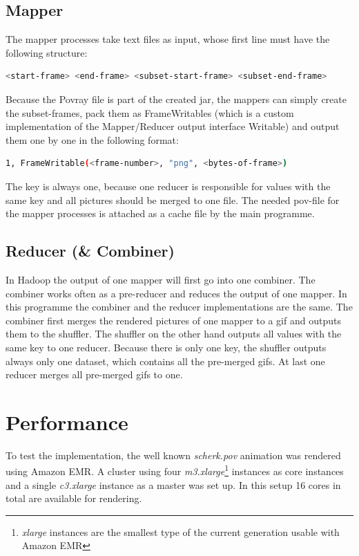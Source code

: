 \documentclass{article}
\begin{document}
\subsection{Mapper}

The mapper processes take text files as input, whose first line must have the following structure:

\begin{lstlisting}[language=bash, deletekeywords={cd}]
  <start-frame> <end-frame> <subset-start-frame> <subset-end-frame>
\end{lstlisting}

Because the Povray file is part of the created jar, the mappers can simply create the subset-frames, pack them as FrameWritables (which is a custom implementation of the Mapper/Reducer output interface Writable) and output them one by one in the following format:

\begin{lstlisting}[language=bash, deletekeywords={cd}]
  1, FrameWritable(<frame-number>, "png", <bytes-of-frame>)
\end{lstlisting}

The key is always one, because one reducer is responsible for values with the same key and all pictures should be merged to one file.
The needed pov-file for the mapper processes is attached as a cache file by the main programme.

\subsection{Reducer (\& Combiner)}
In Hadoop the output of one mapper will first go into one combiner. The combiner works often as a pre-reducer and reduces the output of one mapper. In this programme the combiner and the reducer implementations are the same. The combiner first merges the rendered pictures of one mapper to a gif and outputs them to the shuffler. The shuffler on the other hand outputs all values with the same key to one reducer. Because there is only one key, the shuffler outputs always only one dataset, which contains all the pre-merged gifs. At last one reducer merges all pre-merged gifs to one.

\section{Performance}

To test the implementation, the well known \emph{scherk.pov} animation was rendered using Amazon EMR. A cluster using four \emph{m3.xlarge}\footnote{\emph{xlarge} instances are the smallest type of the current generation usable with Amazon EMR} instances as core instances and a single \emph{c3.xlarge} instance as a master was set up. In this setup 16 cores in total are available for rendering.
\end{document}
